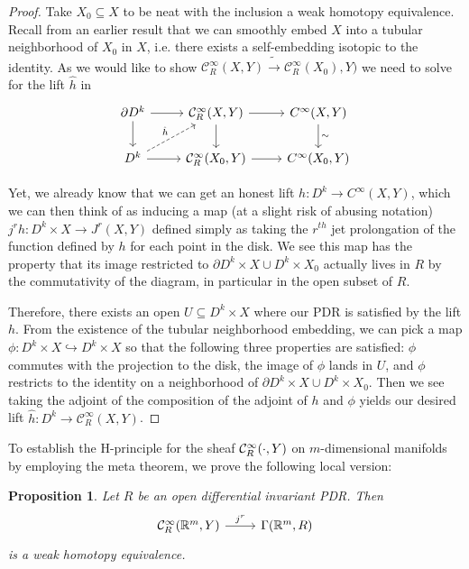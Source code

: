 \documentclass{article}
\newtheorem{proposition}[theorem]{Proposition}
\newtheorem{proposed work}[theorem]{Proposed Work}
\theoremstyle{definition}
\begin{document}
\begin{proof}
Take $X_0 \subseteq X$ to be neat with the inclusion a weak homotopy equivalence. Recall from an earlier result that we can smoothly embed $X$ into a tubular neighborhood of $X_0$ in $X$, i.e. there exists a self-embedding isotopic to the identity. As we would like to show
$\mathcal{C}^\infty_R(X,Y) \tilde{\to} \mathcal{C}^\infty_R(X_0),Y)$
we need to solve for the lift $\hat{h}$ in
\[
\begin{tikzcd}
\partial D^k \ar[r] \ar[d] & \mathcal{C}^\infty_R(X,Y) \ar[r] \ar[d] & C^\infty(X,Y) \ar[d,"\sim"] \\
D^k  \ar[r] \ar[ur,dashed,"\hat{h}"] & \mathcal{C}^\infty_R(X_0,Y) \ar[r] & C^\infty(X_0,Y)
\end{tikzcd}
\]

Yet, we already know that we can get an honest lift $h:D^k \to C^\infty(X,Y)$, which we can then think of as inducing a map (at a slight risk of abusing notation) $j^rh:D^k \times X \to J^r(X,Y)$ defined simply as taking the $r^{th}$ jet prolongation of the function defined by $h$ for each point in the disk. We see this map has the property that its image restricted to $\partial D^k \times X \cup D^k \times X_0$ actually lives in $R$ by the commutativity of the diagram, in particular in the open subset of $R$.

Therefore, there exists an open $U \subseteq D^k \times X$ where our PDR is satisfied by the lift $h$. From the existence of the tubular neighborhood embedding, we can pick a map $\phi: D^k \times X \hookrightarrow D^k \times X$ so that the following three properties are satisfied: $\phi$ commutes with the projection to the disk, the image of $\phi$ lands in $U$, and $\phi$ restricts to the identity on a neighborhood of $\partial D^k \times X \cup D^k \times X_0$. Then we see taking the adjoint of the composition of the adjoint of $h$ and $\phi$ yields our desired lift $\hat{h}:D^k \to \mathcal{C}^\infty_R(X,Y)$.
\end{proof}



To establish the H-principle for the sheaf $\mathcal C^\infty_R(\cdot,Y)$ on
$m$-dimensional manifolds by employing the meta theorem, we prove the
following local version:
\begin{proposition}\label{RdiffInvHtpyeq}
Let $R$ be an open differential invariant PDR. Then
\begin{equation*}
\begin{tikzcd}
\cC^\infty_R(\R^m,Y) \ar[r, "j^r"] & \Gamma(\R^m, R)
\end{tikzcd}
\end{equation*}
is a weak homotopy equivalence.
\end{proposition}
\end{document}
